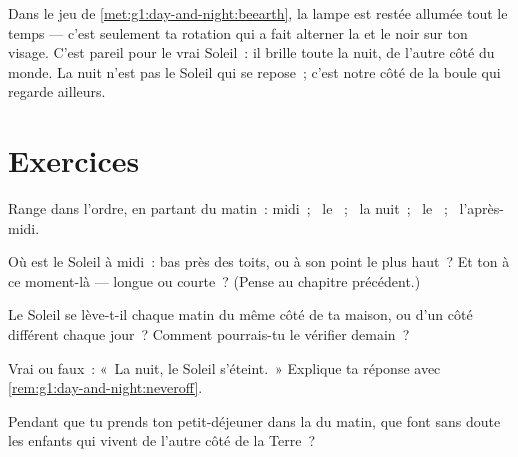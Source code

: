 \begin{remark}\label{rem:g1:day-and-night:neveroff}
Dans le jeu de \cref{met:g1:day-and-night:beearth}, la lampe est
restée allumée tout le temps --- c'est seulement ta rotation qui a
fait alterner la  et le noir sur ton visage. C'est pareil pour
le vrai Soleil~: il brille toute la nuit, de l'autre côté du monde.
La nuit n'est pas le Soleil qui se repose~; c'est notre côté de la
boule qui regarde ailleurs.
\end{remark}

\section{Exercices}

\begin{exercise}[$\star$]\label{exo:g1:day-and-night:1}
Range dans l'ordre, en partant du matin~: midi~; \ le ~; \ la nuit~; \ le ~; \ l'après-midi.
\end{exercise}

\begin{exercise}[$\star$]\label{exo:g1:day-and-night:2}
Où est le Soleil à midi~: bas près des toits, ou à son point le plus
haut~? Et ton  à ce moment-là --- longue ou courte~? (Pense au
chapitre précédent.)
\end{exercise}

\begin{exercise}[$\star$]\label{exo:g1:day-and-night:3}
Le Soleil se lève-t-il chaque matin du même côté de ta maison, ou
d'un côté différent chaque jour~? Comment pourrais-tu le vérifier
demain~?
\end{exercise}

\begin{exercise}[$\star$]\label{exo:g1:day-and-night:4}
Vrai ou faux~: «~La nuit, le Soleil s'éteint.~» Explique ta réponse
avec \cref{rem:g1:day-and-night:neveroff}.
\end{exercise}

\begin{exercise}[$\star$]\label{exo:g1:day-and-night:5}
Pendant que tu prends ton petit-déjeuner dans la  du matin,
que font sans doute les enfants qui vivent de l'autre côté de la
Terre~?
\end{exercise}


